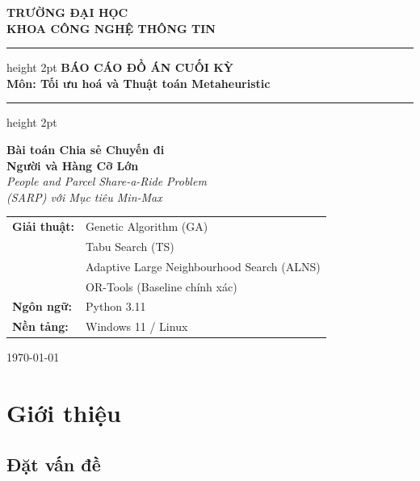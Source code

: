 \documentclass[12pt, a4paper]{article}
\begin{document}
\begin{titlepage}
  \centering
  \vspace*{1cm}
  {\Large \textbf{TRƯỜNG ĐẠI HỌC} \\[0.3em]
   \textbf{KHOA CÔNG NGHỆ THÔNG TIN}}\\[2cm]

  \hrule height 2pt
  \vspace{0.5cm}
  {\LARGE \textbf{BÁO CÁO ĐỒ ÁN CUỐI KỲ}}\\[0.5cm]
  {\large \textbf{Môn: Tối ưu hoá và Thuật toán Metaheuristic}}
  \vspace{0.5cm}
  \hrule height 2pt

  \vspace{1.5cm}
  {\huge \textbf{\color{myblue}
    Bài toán Chia sẻ Chuyến đi\\[0.3em]
    Người và Hàng Cỡ Lớn}}\\[0.8cm]

  {\large \textit{People and Parcel Share-a-Ride Problem}\\[0.3em]
   \textit{(SARP) với Mục tiêu Min-Max}}\\[2cm]

  \begin{tabular}{ll}
    \textbf{Giải thuật:} & Genetic Algorithm (GA) \\
                         & Tabu Search (TS) \\
                         & Adaptive Large Neighbourhood Search (ALNS) \\
                         & OR-Tools (Baseline chính xác) \\[0.5em]
    \textbf{Ngôn ngữ:}   & Python 3.11 \\
    \textbf{Nền tảng:}   & Windows 11 / Linux \\
  \end{tabular}

  \vfill
  {\large \today}
\end{titlepage}

\tableofcontents
\newpage

\section{Giới thiệu}

\subsection{Đặt vấn đề}
\end{document}

